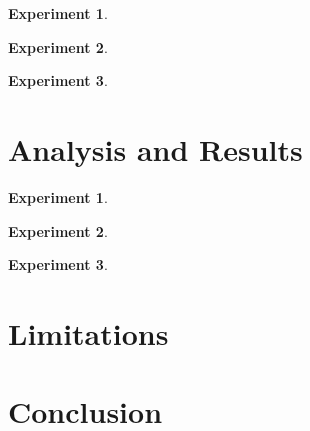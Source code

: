 \documentclass[a4paper,twocolumn]{article}
\begin{document}
\textbf{Experiment 1}.

\textbf{Experiment 2}.

\textbf{Experiment 3}.

\section{Analysis and Results}

\textbf{Experiment 1}.

\textbf{Experiment 2}.

\textbf{Experiment 3}.

\section{Limitations}


\section{Conclusion}




\end{document}
